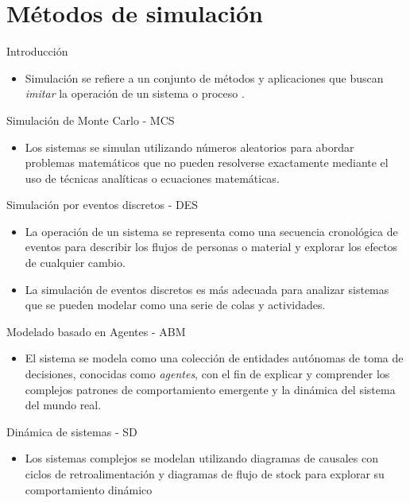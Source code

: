 \section{Métodos de simulación}

\begin{frame}{Introducción}
    \begin{itemize}
        \item Simulación se refiere a un conjunto de métodos y aplicaciones que buscan \textit{imitar} la operación de un sistema o proceso \cite{BCN,KSS}.
    \end{itemize}
\end{frame}

\begin{frame}{Simulación de Monte Carlo - MCS}
    \begin{itemize}
        \item Los sistemas se simulan utilizando números aleatorios para abordar problemas matemáticos que no pueden resolverse exactamente mediante el uso de técnicas analíticas o ecuaciones matemáticas.
    \end{itemize}
\end{frame}

\begin{frame}{Simulación por eventos discretos - DES}
    \begin{itemize}
        \item La operación de un sistema se representa como una secuencia cronológica de eventos para describir los flujos de personas o material y explorar los efectos de cualquier cambio.
        \item La simulación de eventos discretos es más adecuada para analizar sistemas que se pueden modelar como una serie de colas y actividades.
    \end{itemize}
\end{frame}

\begin{frame}{Modelado basado en Agentes - ABM}
    \begin{itemize}
        \item El sistema se modela como una colección de entidades autónomas de toma de decisiones, conocidas como \textit{agentes}, con el fin de explicar y comprender los complejos patrones de comportamiento emergente y la dinámica del sistema del mundo real.
    \end{itemize}
\end{frame}

\begin{frame}{Dinámica de sistemas - SD}
    \begin{itemize}
        \item Los sistemas complejos se modelan utilizando diagramas de causales con ciclos de retroalimentación y diagramas de flujo de stock para explorar su comportamiento dinámico
    \end{itemize}
\end{frame}

